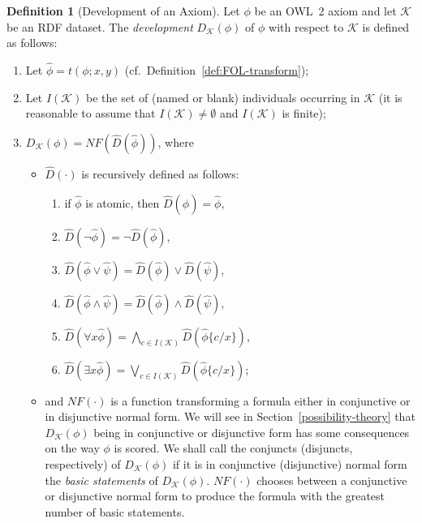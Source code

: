 \documentclass[review]{elsarticle}
\theoremstyle{definition}
\newtheorem{definition}{Definition}
\begin{document}
\begin{definition}[Development of an Axiom]\label{def:development}
  Let $\phi$ be an OWL~2 axiom and let $\mathcal{K}$ be an RDF dataset.
  The \emph{development} $D_{\mathcal{K}}(\phi)$ of $\phi$ with respect
  to $\mathcal{K}$ is defined as follows:
  \begin{enumerate}
  \item Let $\hat{\phi} = t(\phi; x, y)$ (cf.~Definition~\ref{def:FOL-transform});
  \item Let $I(\mathcal{K})$ be the set of (named or blank) individuals occurring
    in $\mathcal{K}$ (it is reasonable to assume that $I(\mathcal{K}) \neq \emptyset$
    and $I(\mathcal{K})$ is finite);
  \item $D_{\mathcal{K}}(\phi) = NF(\hat{D}(\hat{\phi}))$, where 
    \begin{itemize}
    \item $\hat{D}(\cdot)$ is recursively defined as follows:
      \begin{enumerate}
      \item if $\hat{\phi}$ is atomic, then $\hat{D}(\hat{\phi}) = \hat{\phi}$,
      \item $\hat{D}(\neg\hat\phi) = \neg \hat{D}(\hat\phi)$,
      \item $\hat{D}(\hat\phi \lor \hat\psi) = \hat{D}(\hat\phi) \lor \hat{D}(\hat\psi)$,
      \item $\hat{D}(\hat\phi \land \hat\psi) = \hat{D}(\hat\phi) \land \hat{D}(\hat\psi)$,
      \item $\hat{D}(\forall x\hat\phi) = \bigwedge_{c\in I(\mathcal{K})}\hat{D}(\hat\phi\{c/x\})$,
      \item $\hat{D}(\exists x\hat\phi) = \bigvee_{c\in I(\mathcal{K})}\hat{D}(\hat\phi\{c/x\})$;
      \end{enumerate}
    \item and $NF(\cdot)$ is a function transforming a formula either in conjunctive or in disjunctive normal form. We will see in Section~\ref{possibility-theory}
that $D_{\mathcal{K}}(\phi)$ being in conjunctive or
disjunctive form has some consequences on the way $\phi$ is scored.
We shall call the conjuncts (disjuncts, respectively) of $D_{\mathcal{K}}(\phi)$
if it is in conjunctive (disjunctive) normal form the \emph{basic statements}
of $D_{\mathcal{K}}(\phi)$. $NF(\cdot)$ chooses between a conjunctive or disjunctive normal form to produce the formula with the greatest number of basic statements.
    \end{itemize}
  \end{enumerate}
\end{definition}
\end{document}

